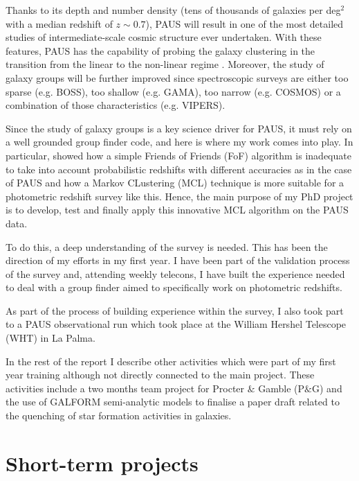 \documentclass[11pt]{article}
\begin{document}
Thanks to its depth and number density (tens of thousands of galaxies per deg$^2$ with a median redshift of $z \sim 0.7$), PAUS will result in one of the most detailed studies of intermediate-scale cosmic structure ever undertaken. With these features, PAUS has the capability of probing the galaxy clustering in the transition from the linear to the non-linear regime \citep{stothert18_thesis}. Moreover, the study of galaxy groups will be further improved since spectroscopic surveys are either too sparse (e.g. BOSS), too shallow (e.g. GAMA), too narrow (e.g. COSMOS) or a combination of those characteristics (e.g. VIPERS).

Since the study of galaxy groups is a key science driver for PAUS, it must rely on a well grounded group finder code, and here is where my work comes into play. In particular, \cite{stothert18_thesis} showed how a simple Friends of Friends (FoF) algorithm is inadequate to take into account probabilistic redshifts with different accuracies as in the case of PAUS and how a Markov CLustering (MCL) technique is more suitable for a photometric redshift survey like this. Hence, the main purpose of my PhD project is to develop, test and finally apply this innovative MCL algorithm on the PAUS data. 

To do this, a deep understanding of the survey is needed. This has been the direction of my efforts in my first year. I have been part of the validation process of the survey and, attending weekly telecons, I have built the experience needed to deal with a group finder aimed to specifically work on photometric redshifts. 

As part of the process of building experience within the survey, I also took part to a PAUS observational run which took place at the William Hershel Telescope (WHT) in La Palma. 

In the rest of the report I describe other activities which were part of my first year training although not directly connected to the main project. These activities include a two months team project for Procter $\&$ Gamble (P$\&$G) and the use of GALFORM semi-analytic models to finalise a paper draft related to the quenching of star formation activities in galaxies.




\section{Short-term projects}
\label{sec:short}
\end{document}
